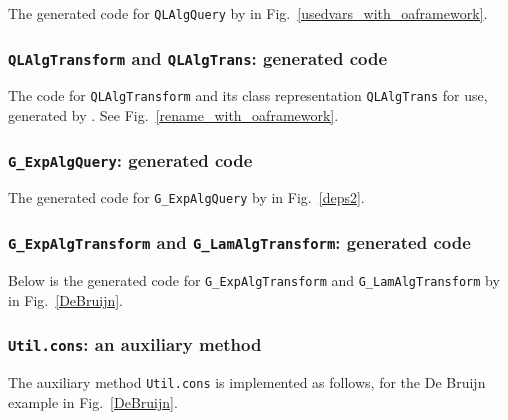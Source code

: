The generated code for \lstinline{QLAlgQuery} by \Name in Fig.~\ref{usedvars_with_oaframework}.


\subsubsection{\lstinline{QLAlgTransform} and \lstinline{QLAlgTrans}: generated code}\label{subsec:appendix_code_qlalgtransform}

The code for \lstinline{QLAlgTransform} and its class representation \lstinline{QLAlgTrans} for use, generated by \Name. See Fig.~\ref{rename_with_oaframework}.


\subsubsection{\lstinline{G_ExpAlgQuery}: generated code}\label{subsec:appendix_code_g_expalgquery}

The generated code for \lstinline{G_ExpAlgQuery} by \Name in Fig.~\ref{deps2}.


\subsubsection{\lstinline{G_ExpAlgTransform} and \lstinline{G_LamAlgTransform}: generated code}\label{subsec:appendix_code_g_explam_transform}

Below is the generated code for \lstinline{G_ExpAlgTransform} and \lstinline{G_LamAlgTransform} by \Name in Fig.~\ref{DeBruijn}.


\subsubsection{\lstinline{Util.cons}: an auxiliary method}\label{subsec:appendix_util_cons}

The auxiliary method \lstinline{Util.cons} is implemented as follows, for the De Bruijn example in Fig.~\ref{DeBruijn}.

